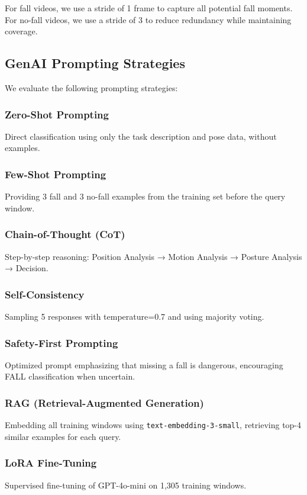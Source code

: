 \documentclass[conference]{IEEEtran}
\begin{document}
For fall videos, we use a stride of 1 frame to capture all potential fall moments. For no-fall videos, we use a stride of 3 to reduce redundancy while maintaining coverage.

\subsection{GenAI Prompting Strategies}

We evaluate the following prompting strategies:

\subsubsection{Zero-Shot Prompting}
Direct classification using only the task description and pose data, without examples.

\subsubsection{Few-Shot Prompting}
Providing 3 fall and 3 no-fall examples from the training set before the query window.

\subsubsection{Chain-of-Thought (CoT)}
Step-by-step reasoning: Position Analysis → Motion Analysis → Posture Analysis → Decision.

\subsubsection{Self-Consistency}
Sampling 5 responses with temperature=0.7 and using majority voting.

\subsubsection{Safety-First Prompting}
Optimized prompt emphasizing that missing a fall is dangerous, encouraging FALL classification when uncertain.

\subsubsection{RAG (Retrieval-Augmented Generation)}
Embedding all training windows using \texttt{text-embedding-3-small}, retrieving top-4 similar examples for each query.

\subsubsection{LoRA Fine-Tuning}
Supervised fine-tuning of GPT-4o-mini on 1,305 training windows.
\end{document}

